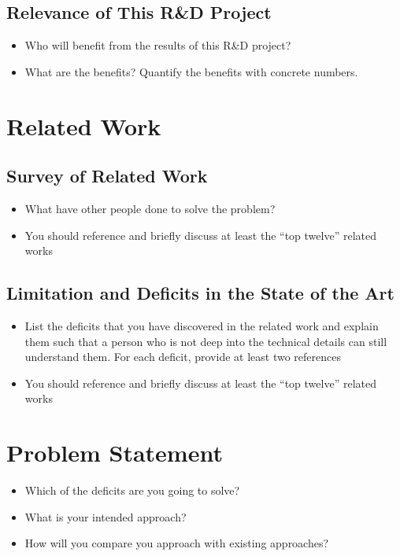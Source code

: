 \documentclass[rnd]{mas_proposal}
\begin{document}
\subsection{Relevance of This R\&D Project}
\begin{itemize}
    \item Who will benefit from the results of this R\&D project?
    \item What are the benefits? Quantify the benefits with concrete numbers.
 \end{itemize}

\section{Related Work}

\subsection{Survey of Related Work}
\begin{itemize}
    \item What have other people done to solve the problem?
    \item You should reference and briefly discuss at least the ``top twelve'' related works
\end{itemize}

\subsection{Limitation and Deficits in the State of the Art}
\begin{itemize}
    \item List the deficits that you have discovered in the related work and explain them such that a person who is not deep into the technical details can still understand them.
    For each deficit, provide at least two references
    \item You should reference and briefly discuss at least the ``top twelve'' related works
\end{itemize}

\section{Problem Statement}
\begin{itemize}
    \item Which of the deficits are you going to solve?
    \item What is your intended approach?
    \item How will you compare you approach with existing approaches?
\end{itemize}
\end{document}
